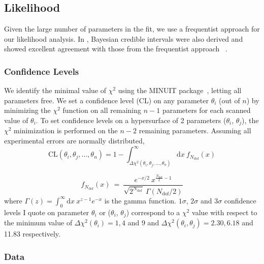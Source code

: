 \subsection{Likelihood}
\label{sec:likelihood}

Given the large number of parameters in the fit, we use a frequentist approach for our likelihood analysis. In \cite{Palanque2015a}, Bayesian credible intervals were also derived and showed excellent agreement with those from the frequentist approach ~\citep{Yeche2006, PlanckCollaboration2014Freq}. 

\subsubsection{Confidence Levels}

We identify the minimal value of $\chi^2$ using the \textsf{MINUIT} package~\citep{Minuit}, letting all parameters free. We set a confidence level (CL) on any parameter $\theta_i$ (out of $n$) by minimizing the $\chi^2$ function on all remaining $n-1$ parameters for each scanned value of $\theta_i$. To set confidence levels on a hypersurface of 2 parameters ($\theta_i$, $\theta_j$), the $\chi^2$ minimization is performed on the $n-2$ remaining parameters. Assuming all experimental errors are normally distributed, 
\begin{equation}
\mathrm{CL}(\theta_i, \theta_j, ..., \theta_n) = 1 - \int_{\Delta \chi^2 (\theta_i, \theta_j, ..., \theta_n)}^{\infty} \mathrm{d} x ~ f_{N_{\mathrm{dof}}}(x)
\label{eq:CL}
\end{equation}

\begin{equation}
f_{N_{\mathrm{dof}}}(x) ~ = ~ \frac{e^{-x/2} ~ x^{\frac{N_{\mathrm{dof}}}{2}-1}}{\sqrt{2^{N_{\mathrm{dof}}}} ~ \Gamma (N_{\mathrm{dof}}/2)}
\label{eq:proba}
\end{equation} where $\Gamma (z) = \displaystyle \int_{0}^{\infty} \mathrm{d}x~ x^{z-1} e^{-x}$ is the gamma function. $1\sigma$, $2\sigma$ and $3\sigma$ confidence levels I quote on parameter $\theta_i$ or ($\theta_i$, $\theta_j$) correspond to a $\chi^2$ value with respect to the minimum value of $\Delta \chi^2 (\theta_i) = 1, 4$ and 9 and $\Delta \chi^2 (\theta_i, \theta_j) = 2.30, 6.18$ and 11.83 respectively. 


\subsubsection{Data}
\label{sec:data}

